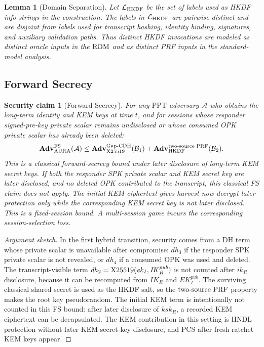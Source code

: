 \documentclass[preprint,12pt]{elsarticle}
\newtheorem{lemma}[theorem]{Lemma}
\newtheorem{securityclaim}[theorem]{Security claim}
\theoremstyle{definition}
\newcommand{\tech}[1]{\textnormal{#1}}
\newcommand{\ppt}{\mathrm{PPT}}
\newcommand{\adv}{\mathbf{Adv}}
\newcommand{\advA}{\mathcal{A}}
\newcommand{\advB}{\mathcal{B}}
\newcommand{\HKDF}{\tech{HKDF}}
\renewcommand{\DH}{\tech{X25519}}
\newcommand{\GapCDH}{\tech{Gap-CDH}}
\newcommand{\twoSourcePRF}{\tech{two-source PRF}}
\newcommand{\ROM}{\tech{ROM}}
\newcommand{\IK}{\mathit{IK}}
\newcommand{\EK}{\mathit{EK}}
\begin{document}
\begin{lemma}[Domain Separation]\label{lem:domain-sep}
Let $\mathcal{L}_{\HKDF}$ be the set of labels used as HKDF info strings in
the construction. The labels in $\mathcal{L}_{\HKDF}$ are pairwise distinct
and are disjoint from labels used for transcript hashing, identity binding,
signatures, and auxiliary validation paths. Thus distinct HKDF invocations are
modeled as distinct oracle inputs in the $\ROM$ and as distinct PRF inputs in
the standard-model analysis.
\end{lemma}

\subsection{Forward Secrecy}

\begin{securityclaim}[Forward Secrecy]\label{thm:fs}
For any $\ppt$ adversary $\advA$ who obtains the long-term identity and KEM keys at time $t$, and for sessions whose responder signed-pre-key private scalar remains undisclosed or whose consumed OPK private scalar has already been deleted:
\begin{equation}\label{eq:fs-bound}
  \adv^{\mathrm{FS}}_{\mathrm{AURA}}(\advA) \leq \adv^{\GapCDH}_{\DH}(\advB_1) + \adv^{\twoSourcePRF}_{\HKDF}(\advB_2).
\end{equation}
This is a classical forward-secrecy bound under later disclosure of long-term
KEM secret keys. If both the responder SPK private scalar and KEM secret key
are later disclosed, and no deleted OPK contributed to the transcript, this
classical FS claim does not apply. The initial KEM ciphertext gives
harvest-now-decrypt-later protection only while the corresponding KEM secret
key is not later disclosed.
This is a fixed-session bound. A multi-session game incurs the corresponding
session-selection loss.
\end{securityclaim}

\begin{proof}[Argument sketch]
In the first hybrid transition, security comes from a DH term whose private scalar is unavailable
after compromise: $\mathit{dh}_3$ if the responder SPK private scalar is not
revealed, or $\mathit{dh}_4$ if a consumed OPK was used and deleted. The
transcript-visible term $\mathit{dh}_2=\DH(\mathit{ek}_I,\IK_R^{\mathit{pub}})$
is not counted after $\mathit{ik}_R$ disclosure, because it can be recomputed
from $\IK_R$ and $\EK_I^{\mathit{pub}}$. The surviving classical shared secret
is used as the HKDF salt, so the $\twoSourcePRF$ property makes the root key
pseudorandom. The initial KEM term is intentionally not counted in this FS bound:
after later disclosure of $\mathit{ksk}_R$, a recorded KEM ciphertext can be
decapsulated. The KEM contribution in this setting is HNDL protection without
later KEM secret-key disclosure, and PCS after fresh ratchet KEM keys appear.
\end{proof}
\end{document}
